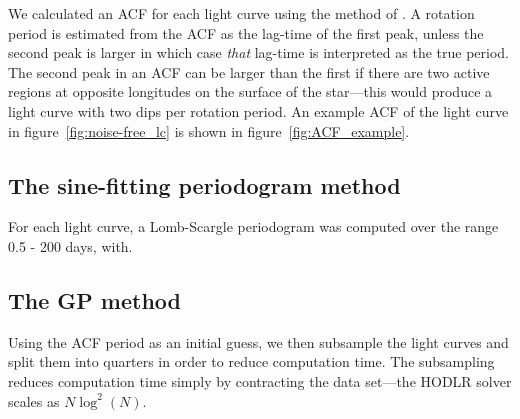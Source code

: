 We calculated an ACF for each light curve using the method of
\citet{mcquillan13}.
A rotation period is estimated from the ACF as the lag-time of the first peak,
unless the second peak is larger in which case {\it that} lag-time is
interpreted as the true period.
The second peak in an ACF can be larger than the first if there are two active
regions at opposite longitudes on the surface of the star---this would produce
a light curve with two dips per rotation period.
An example ACF of the light curve in figure~\ref{fig:noise-free_lc} is shown
in figure~\ref{fig:ACF_example}.

\subsection{The sine-fitting periodogram method}

For each light curve, a Lomb-Scargle periodogram was computed over the range
0.5 - 200 days, with.

\subsection{The GP method}

Using the ACF period as an initial guess, we then subsample the light curves
and split them into \kepler quarters in order to reduce computation time.
The subsampling reduces computation time simply by contracting the data
set---the HODLR solver scales as $N \log ^2 (N)$.

